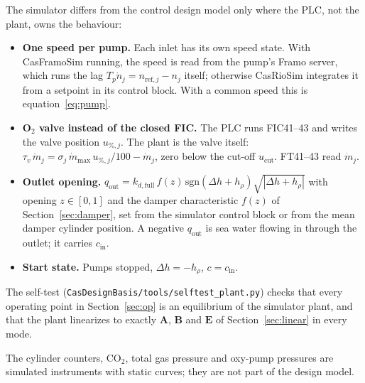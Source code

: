 \documentclass[11pt]{article}
\begin{document}
The simulator differs from the control design model only where the PLC, not the plant, owns
the behaviour:
\begin{itemize}
  \item \textbf{One speed per pump.} Each inlet has its own speed state. With CasFramoSim
        running, the speed is read from the pump's Framo server, which runs the lag
        $T_p\dot n_j = n_{\text{ref},j} - n_j$ itself; otherwise CasRioSim integrates it from a
        setpoint in its control block. With a common speed this is equation~\eqref{eq:pump}.
  \item \textbf{O$_2$ valve instead of the closed FIC.} The PLC runs FIC41--43 and writes the
        valve position $u_{\%,j}$. The plant is the valve itself:
        $\tau_v\,\ddot m_j = \sigma_j\,\dot m_\text{max}\,u_{\%,j}/100 - \dot m_j$, zero below
        the cut-off $u_\text{cut}$. FT41--43 read $\dot m_j$.
  \item \textbf{Outlet opening.} $q_\text{out} = k_{d,\text{full}}\,f(z)\,\mathrm{sgn}(\Delta h+h_\rho)
        \sqrt{|\Delta h+h_\rho|}$ with opening $z\in[0,1]$ and the damper characteristic $f(z)$ of
        Section~\ref{sec:damper}, set from the simulator control block or
        from the mean damper cylinder position. A negative $q_\text{out}$ is sea water flowing in
        through the outlet; it carries $c_\text{in}$.
  \item \textbf{Start state.} Pumps stopped, $\Delta h = -h_\rho$, $c = c_\text{in}$.
\end{itemize}
The self-test (\texttt{CasDesignBasis/tools/selftest\_plant.py}) checks that every operating point in
Section~\ref{sec:op} is an equilibrium of the simulator plant, and that the plant linearizes to
exactly $\mathbf A$, $\mathbf B$ and $\mathbf E$ of Section~\ref{sec:linear} in every mode.

The cylinder counters, CO$_2$, total gas pressure and oxy-pump pressures are simulated
instruments with static curves; they are not part of the design model.
\end{document}
